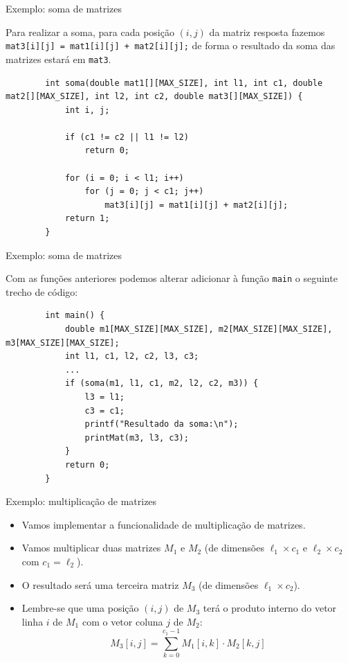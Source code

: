 \documentclass[handout]{beamer}
\newcommand{\cod}[1]{\texttt{#1}}
\begin{document}
\begin{frame}[fragile]{Exemplo: soma de matrizes}

    Para realizar a soma, para cada posição $(i,j)$ da matriz resposta fazemos\\
        \cod{mat3[i][j] = mat1[i][j] + mat2[i][j];}
    de forma o resultado da soma das matrizes estará em \cod{mat3}.

    \pause

    \begin{verbatim}
        int soma(double mat1[][MAX_SIZE], int l1, int c1, double mat2[][MAX_SIZE], int l2, int c2, double mat3[][MAX_SIZE]) {
            int i, j;

            if (c1 != c2 || l1 != l2)
                return 0;
            
            for (i = 0; i < l1; i++)
                for (j = 0; j < c1; j++)
                    mat3[i][j] = mat1[i][j] + mat2[i][j];
            return 1;
        }
    \end{verbatim}

\end{frame}

\begin{frame}[fragile]{Exemplo: soma de matrizes}

    Com as funções anteriores podemos alterar adicionar à função \cod{main} o seguinte trecho de código:

    \begin{verbatim}
        int main() {
            double m1[MAX_SIZE][MAX_SIZE], m2[MAX_SIZE][MAX_SIZE], m3[MAX_SIZE][MAX_SIZE];
            int l1, c1, l2, c2, l3, c3;
            ...
            if (soma(m1, l1, c1, m2, l2, c2, m3)) {
                l3 = l1;
                c3 = c1;
                printf("Resultado da soma:\n");
                printMat(m3, l3, c3);
            }
            return 0;
        }
    \end{verbatim}

\end{frame}

\begin{frame}[fragile]{Exemplo: multiplicação de matrizes}

    \begin{itemize}[<+->]
        \item Vamos implementar a funcionalidade de multiplicação de matrizes.
        \item Vamos multiplicar duas matrizes $M_1$ e $M_2$ (de dimensões $\ell_1 \times c_1$ e $\ell_2 \times c_2$ com $c_1=\ell_2$).
        \item O resultado será uma terceira matriz $M_3$ (de dimensões $\ell_1 \times c_2$).
        \item Lembre-se que uma posição $(i,j)$ de $M_3$ terá o produto interno do vetor linha $i$ de $M_1$ com o vetor coluna $j$ de $M_2$:
        $$ M_3[i,j] = \sum_{k=0}^{c_1-1} M_1[i,k] \cdot M_2[k,j] $$
    \end{itemize}

\end{frame}
\end{document}
